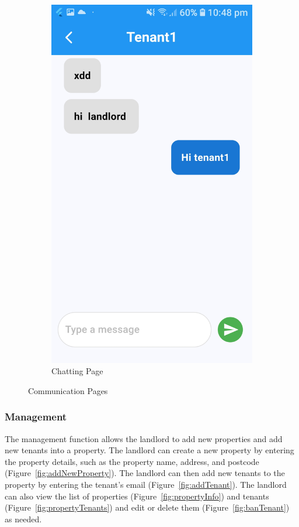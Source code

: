 \documentclass[sigconf,nonacm]{acmart}\settopmatter{printfolios=true}
\begin{document}
\begin{figure}[htbp]
\begin{subfigure}{0.24\textwidth}
    \includegraphics[width=\textwidth]{chatting.jpg}
    \caption{Chatting Page}
    \label{fig:chatRoom}
  \end{subfigure}
  \caption{Communication Pages}
\end{figure}

\subsubsection{\textbf{Management}}
The management function allows the landlord to add new properties and add new tenants into a property. The landlord can create a new property by entering the property details, such as the property name, address, and postcode (Figure~\ref{fig:addNewProperty}). The landlord can then add new tenants to the property by entering the tenant's email (Figure~\ref{fig:addTenant}). The landlord can also view the list of properties (Figure~\ref{fig:propertyInfo}) and tenants (Figure~\ref{fig:propertyTenants}) and edit or delete them (Figure~\ref{fig:banTenant}) as needed.
\end{document}
